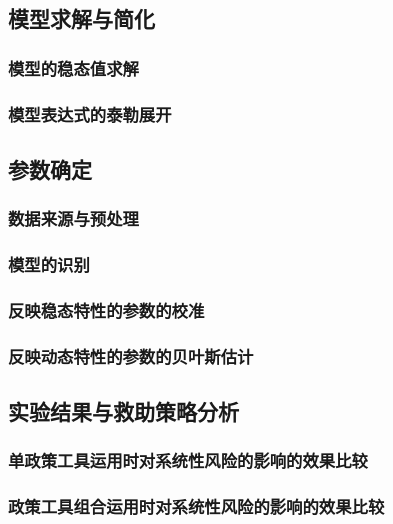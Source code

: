 
\newpage
\subsection{模型求解与简化}

\subsubsection{模型的稳态值求解}
\subsubsection{模型表达式的泰勒展开}

\newpage
\subsection{参数确定}

\subsubsection{数据来源与预处理}
\subsubsection{模型的识别}
\subsubsection{反映稳态特性的参数的校准}
\subsubsection{反映动态特性的参数的贝叶斯估计}

\newpage
\subsection{实验结果与救助策略分析}

\subsubsection{单政策工具运用时对系统性风险的影响的效果比较}
\subsubsection{政策工具组合运用时对系统性风险的影响的效果比较}


